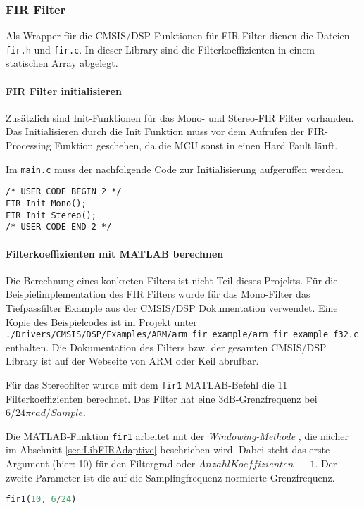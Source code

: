 \subsubsection{FIR Filter}
\label{sec:LibFIRFilter}

Als Wrapper für die CMSIS/DSP Funktionen für FIR Filter dienen die Dateien \texttt{fir.h} und \texttt{fir.c}. In dieser Library sind die Filterkoeffizienten in einem statischen Array abgelegt.


\paragraph{FIR Filter initialisieren}

Zusätzlich sind Init-Funktionen für das Mono- und Stereo-FIR Filter vorhanden. 
Das Initialisieren durch die Init Funktion muss vor dem Aufrufen der FIR-Processing Funktion geschehen, da die MCU sonst in einen Hard Fault läuft.

Im \texttt{main.c} muss der nachfolgende Code zur Initialisierung aufgeruffen werden.

\begin{lstlisting}[style=Cuvision, caption={Init Funktion der FIR Filter}]
/* USER CODE BEGIN 2 */
FIR_Init_Mono();
FIR_Init_Stereo();
/* USER CODE END 2 */
\end{lstlisting}


\paragraph{Filterkoeffizienten mit MATLAB berechnen}

Die Berechnung eines konkreten Filters ist nicht Teil dieses Projekts.
Für die Beispielimplementation des FIR Filters wurde für das Mono-Filter das Tiefpassfilter Example aus der CMSIS/DSP Dokumentation verwendet. 
Eine Kopie des Beispielcodes ist im Projekt unter \\
\texttt{./Drivers/CMSIS/DSP/Examples/ARM/arm\_fir\_example/arm\_fir\_example\_f32.c} enthalten.
Die Dokumentation des Filters bzw. der gesamten CMSIS/DSP Library ist auf der Webseite von ARM \cite{cmsis-doc-arm} oder Keil \cite{cmsis-doc-keil} abrufbar.

Für das Stereofilter wurde mit dem \texttt{fir1} MATLAB-Befehl die 11 Filterkoeffizienten berechnet. Das Filter hat eine 3dB-Grenzfrequenz bei $6/24 \pi rad/Sample$.

Die MATLAB-Funktion \texttt{fir1} arbeitet mit der \textit{Windowing-Methode} \cite{FIR-Windowing}, die nächer im Abschnitt \ref{sec:LibFIRAdaptive} beschrieben wird.
Dabei steht das erste Argument (hier: 10) für den Filtergrad oder $Anzahl Koeffizienten\ -\ 1$. Der zweite Parameter ist die auf die Samplingfrequenz normierte Grenzfrequenz.

\begin{lstlisting}[language=matlab]
fir1(10, 6/24)
\end{lstlisting}



